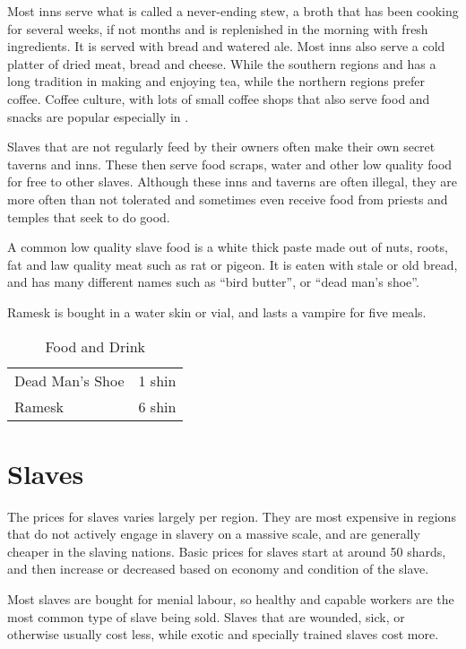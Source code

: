 Most inns serve what is called a never-ending stew, a broth that has been
cooking for several weeks, if not months and is replenished in the morning
with fresh ingredients. It is served with bread and watered ale. Most inns
also serve a cold platter of dried meat, bread and cheese. While the southern
regions and  has a long tradition in making and enjoying
tea, while the northern regions prefer coffee. Coffee culture, with lots of
small coffee shops that also serve food and snacks are popular especially
in .

Slaves that are not regularly feed by their owners often make their own
secret taverns and inns. These then serve food scraps, water and other low
quality food for free to other slaves. Although these inns and taverns are
often illegal, they are more often than not tolerated and sometimes even
receive food from priests and temples that seek to do good.

A common low quality slave food is a white thick paste made out of nuts,
roots, fat and law quality meat such as rat or pigeon. It is eaten with
stale or old bread, and has many different names such as ``bird butter'',
or ``dead man's shoe''.

Ramesk is bought in a water skin or vial, and lasts a vampire for five meals.

\begin{table*}
  \caption{Food and Drink} \label{tbl:Food and Drink}
  \begin{tabular}{p{10cm} l}
    Dead Man's Shoe             &  1 shin \\
    Ramesk                      &  6 shin \\
  \end{tabular}
\end{table*}

\section{Slaves}
\label{sec:Slave Prices}

The prices for slaves varies largely per region. They are most expensive in
regions that do not actively engage in slavery on a massive scale, and are
generally cheaper in the slaving nations. Basic prices for slaves start at
around 50 shards, and then increase or decreased based on economy and
condition of the slave.

Most slaves are bought for menial labour, so healthy and capable workers are
the most common type of slave being sold. Slaves that are wounded, sick, or
otherwise usually cost less, while exotic and specially trained slaves cost
more.

